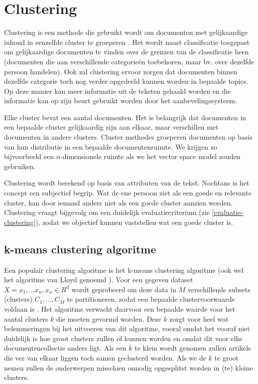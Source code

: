 \section{Clustering}
Clustering is een methode die gebruikt wordt om documenten met gelijkaardige inhoud in eenzelfde cluster te groeperen \cite{Hotho2005}. Het wordt naast classificatie toegepast om gelijkaardige documenten te vinden over de grenzen van de classificatie heen (documenten die aan verschillende categorie\"en toebehoren, maar bv. over dezelfde persoon handelen). Ook zal clustering ervoor zorgen dat documenten binnen dezelfde categorie toch nog verder opgedeeld kunnen worden in bepaalde topics. Op deze manier kan meer informatie uit de teksten gehaald worden en die informatie kan op zijn beurt gebruikt worden door het aanbevelingssysteem. 

Elke cluster bevat een aantal documenten. Het is belangrijk dat documenten in een bepaalde cluster gelijkaardig zijn aan elkaar, maar verschillen met documenten in andere clusters. Cluster methodes groeperen documenten op basis van hun distributie in een bepaalde documentenruimte. We krijgen zo bijvoorbeeld een $n$-dimensionele ruimte als we het vector space model zouden gebruiken.

Clustering wordt berekend op basis van attributen van de tekst. Nochtans is het concept  een subjectief begrip. Wat de ene persoon ziet als een goede en relevante cluster, kan door iemand anders niet als een goede cluster aanzien worden. Clustering vraagt bijgevolg om een duidelijk evaluatiecriterium (zie \ref{evaluatie-clustering}), zodat we objectief kunnen vaststellen wat een goede cluster is.

\subsection{k-means clustering algoritme}
Een populair clustering algoritme is het k-means clustering algoritme (ook wel het algoritme van Lloyd genoemd \cite{Lloyd1982}). Voor een gegeven dataset $X = {x_1,...x_n}, x_n \in R^d$ wordt geprobeerd om deze data in $M$ verschillende subsets (clusters) $C_1,...,C_M$ te partitioneren, zodat een bepaalde clustervoorwaarde voldaan is \cite{Likas2011}. Het algoritme verwacht daarvoor een bepaalde waarde voor het aantal clusters $k$ die moeten gevormd worden. Deze $k$ zorgt voor heel wat belemmeringen bij het uitvoeren van dit algoritme, vooral omdat het vooraf niet duidelijk is hoe groot clusters zullen of kunnen worden en omdat dit voor elke documentencollectie anders ligt. Als een $k$ te klein wordt genomen zullen artikels die ver van elkaar liggen toch samen geclusterd worden. Als we de $k$ te groot nemen zullen de onderwerpen misschien onnodig opgesplitst worden in (te) kleine clusters.

